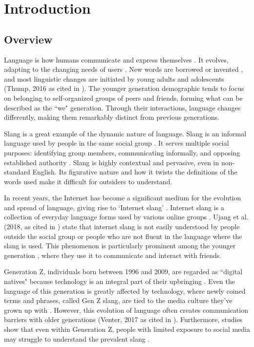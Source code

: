 \chapter{Introduction}
\label{sec:researchdesc}    %

\section{Overview}
\label{sec:overview}

Language is how humans communicate and express themselves \cite{Crystal_Robins_2024}. It evolves, adapting to the changing needs of users \cite{Jeresano_Carretero_2022}. New words are borrowed or invented \cite{article}, and most linguistic changes are initiated by young adults and adolescents (Thump, 2016 as cited in \cite{Jeresano_Carretero_2022}). The younger generation demographic tends to focus on belonging to self-organized groups of peers and friends, forming what can be described as the ``we" generation. Through their interactions, language changes differently, making them remarkably distinct from previous generations.

Slang is a great example of the dynamic nature of language. Slang is an informal language used by people in the same social group \cite{Fernández-Toro_2016}. It serves multiple social purposes: identifying group members, communicating informally, and opposing established authority \cite{McArthur_1998}. Slang is highly contextual and pervasive, even in non-standard English. Its figurative nature and how it twists the definitions of the words used make it difficult for outsiders to understand. 

In recent years, the Internet has become a significant medium for the evolution and spread of language, giving rise to `Internet slang' \cite{Liu_Zhang_Li_2023}. Internet slang is a collection of everyday language forms used by various online groups \cite{Barseghyan2014ONSA}. Ujang et al. (2018, as cited in \cite{Sabri2020}) state that internet slang is not easily understood by people outside the social group or people who are not fluent in the language where the slang is used. This phenomenon is particularly prominent among the younger generation \cite{Maulidiya_Wijaya_Mauren_Adha_Pandin_2021}, where they use it to communicate and interact with friends.

Generation Z, individuals born between 1996 and 2009, are regarded as ``digital natives" because technology is an integral part of their upbringing \cite{Dua_Jacobson_Ellingrud_Enomoto_Cordina_Coe_Finneman_2024}. Even the language of this generation is greatly affected by technology, where newly coined terms and phrases, called Gen Z slang, are tied to the media culture they've grown up with \cite{Jeresano_Carretero_2022}. However, this evolution of language often creates communication barriers with older generations (Venter, 2017 as cited in \cite{Ghazali_Abdullah_2021}). Furthermore, studies show that even within Generation Z, people with limited exposure to social media may struggle to understand the prevalent slang \cite{Vacalares_Salas_Babac_Cagalawan_Calimpong_2023}. 

